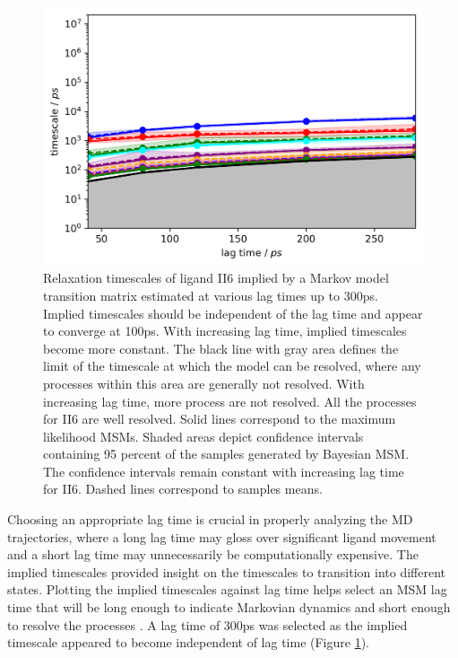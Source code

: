 \begin{figure}
    \centering
    \includegraphics{chapter5/II6/II6_1-full-implied-timescale.png}
    \caption[SEH Implied Timescales]{Relaxation timescales of ligand II6 implied by a Markov model transition matrix estimated at various lag times up to 300ps. Implied timescales should be independent of the lag time and appear to converge at 100ps. With increasing lag time, implied timescales become more constant. The black line with gray area defines the limit of the timescale at which the model can be resolved, where any processes within this area are generally not resolved. With increasing lag time, more process are not resolved. All the processes for II6 are well resolved. Solid lines correspond to the maximum likelihood MSMs. Shaded areas depict confidence intervals containing 95 percent of the samples generated by Bayesian MSM. The confidence intervals remain constant with increasing lag time for II6. Dashed lines correspond to samples means. }
    \label{fig:II6-implied}
\end{figure}

Choosing an appropriate lag time is crucial in properly analyzing the MD trajectories, where a long lag time may gloss over significant ligand movement and a short lag time may unnecessarily be computationally expensive.
The implied timescales provided insight on the timescales to transition into different states.
Plotting the implied timescales against lag time helps select an MSM lag time that will be long enough to indicate Markovian dynamics and short enough to resolve the processes \cite{wehmeyer_introduction_2018}.
A lag time of 300ps was selected as the implied timescale appeared to become independent of lag time (Figure \ref{fig:II6-implied}). 

